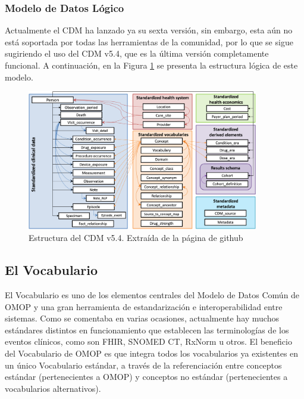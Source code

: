 \subsubsection{Modelo de Datos Lógico}

Actualmente el CDM ha lanzado ya su sexta versión, sin embargo, esta aún no está soportada por todas las herramientas de la comunidad, por lo que se sigue sugiriendo el uso del CDM v5.4, que es la última versión completamente funcional. A continuación, en la Figura \ref{fig:cdm54} se presenta la estructura lógica de este modelo.

\begin{figure}[H]
    \centering
    \includegraphics[width=0.90\textwidth]{figures/cdm54.png}
     \caption{Estructura del CDM v5.4. Extraída de la página de github \cite{gitPagesCMD}}
    \label{fig:cdm54}
\end{figure}


\subsection{El Vocabulario}\label{subsec:05vocab}

El Vocabulario es uno de los elementos centrales del Modelo de Datos Común de OMOP y una gran herramienta de estandarización e interoperabilidad entre sistemas. Como se comentaba en varias ocasiones, actualmente hay muchos estándares distintos en funcionamiento que establecen las terminologías de los eventos clínicos, como son FHIR, SNOMED CT, RxNorm u otros. El beneficio del Vocabulario de OMOP es que integra todos los vocabularios ya existentes en un único Vocabulario estándar, a través de la referenciación entre conceptos estándar (pertenecientes a OMOP) y conceptos no estándar (pertenecientes a vocabularios alternativos).

